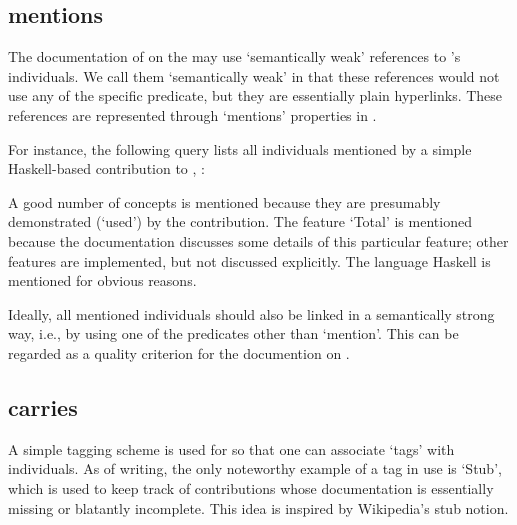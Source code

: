 


\subsection{mentions}
\label{S:mentions}

The documentation of \solasote{} on the  may use
`semantically weak' references to \solasote's individuals. We call
them `semantically weak' in that these references would not use any of
the specific predicate, but they are essentially plain
hyperlinks. These references are represented through `mentions'
properties in \solasote. 

For instance, the following query lists all individuals mentioned by a
simple Haskell-based contribution to \ooo{},
:



\noindent
A good number of concepts is mentioned because they are presumably
demonstrated (`used') by the contribution. The feature `Total' is
mentioned because the documentation discusses some details of this
particular feature; other features are implemented, but not discussed
explicitly. The language Haskell is mentioned for obvious reasons.

Ideally, all mentioned individuals should also be linked in a
semantically strong way, i.e., by using one of the predicates other
than `mention'. This can be regarded as a quality criterion for the
documention on .


\subsection{carries}
\label{S:carries}

A simple tagging scheme is used for \solasote{} so that one can
associate `tags' with individuals. As of writing, the only noteworthy
example of a tag in use is `Stub', which is used to keep track of
contributions whose documentation is essentially missing or blatantly
incomplete. This idea is inspired by Wikipedia's stub notion.

